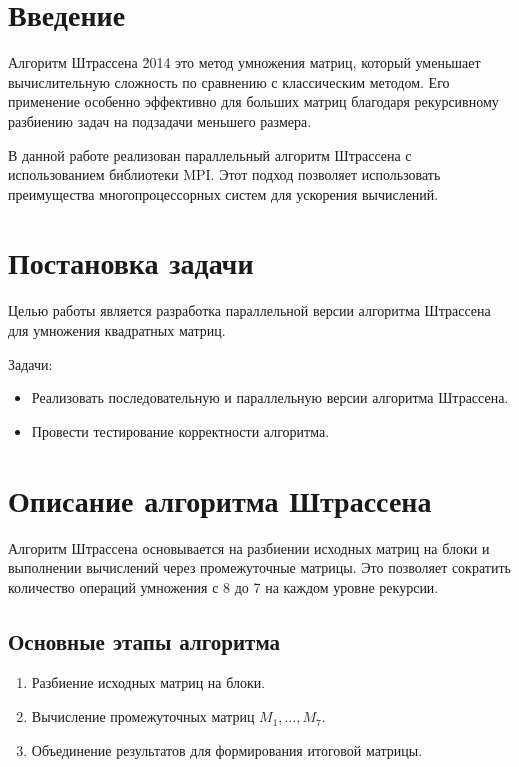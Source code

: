 \documentclass{report}
\begin{document}
\setcounter{page}{2}

\tableofcontents

\newpage

\section*{Введение}   
Алгоритм Штрассена \u2014 это метод умножения матриц, который уменьшает вычислительную сложность по сравнению с классическим методом. Его применение особенно эффективно для больших матриц благодаря рекурсивному разбиению задач на подзадачи меньшего размера.

В данной работе реализован параллельный алгоритм Штрассена с использованием библиотеки MPI. Этот подход позволяет использовать преимущества многопроцессорных систем для ускорения вычислений.

\newpage

\section*{Постановка задачи} 
Целью работы является разработка параллельной версии алгоритма Штрассена для умножения квадратных матриц.

Задачи:
\begin{itemize}
\item Реализовать последовательную и параллельную версии алгоритма Штрассена.
\item Провести тестирование корректности алгоритма.
\end{itemize}

\newpage

\section*{Описание алгоритма Штрассена} 
Алгоритм Штрассена основывается на разбиении исходных матриц на блоки и выполнении вычислений через промежуточные матрицы. Это позволяет сократить количество операций умножения с 8 до 7 на каждом уровне рекурсии.

\subsection*{Основные этапы алгоритма}
\begin{enumerate}
\item Разбиение исходных матриц на блоки.
\item Вычисление промежуточных матриц $M_1, \dots, M_7$.
\item Объединение результатов для формирования итоговой матрицы.
\end{enumerate}
\end{document}

